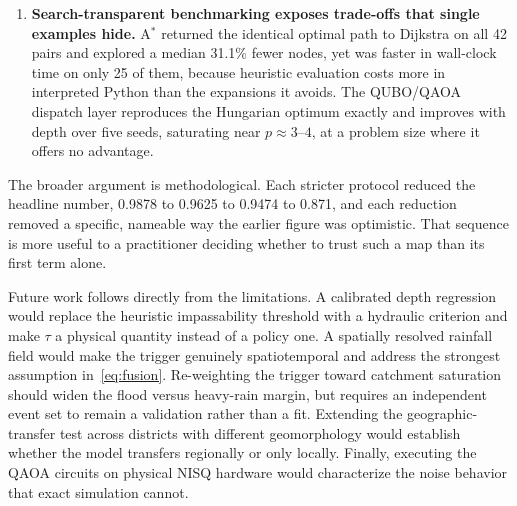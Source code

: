 \documentclass[10pt,twocolumn]{article}
\begin{document}
\begin{enumerate}
      pairs at $\tau\ge0.65$, $0.55$--$0.60$ and $\le0.50$. $\tau$ should be set
      by policy on acceptable risk, not by convention.
\item \textbf{Search-transparent benchmarking exposes trade-offs that single
      examples hide.} A$^\ast$ returned the identical optimal path to Dijkstra on
      all 42 pairs and explored a median 31.1\% fewer nodes, yet was faster in
      wall-clock time on only 25 of them, because heuristic evaluation costs more
      in interpreted Python than the expansions it avoids. The QUBO/QAOA dispatch
      layer reproduces the Hungarian optimum exactly and improves with depth
      over five seeds, saturating near $p\approx3$--$4$, at a problem size where
      it offers no advantage.
\end{enumerate}

The broader argument is methodological. Each stricter protocol reduced the
headline number, 0.9878 to 0.9625 to 0.9474 to 0.871, and each reduction removed
a specific, nameable way the earlier figure was optimistic. That sequence is more
useful to a practitioner deciding whether to trust such a map than its first term
alone.

Future work follows directly from the limitations. A calibrated depth regression
would replace the heuristic impassability threshold with a hydraulic criterion
and make $\tau$ a physical quantity instead of a policy one. A spatially
resolved rainfall field would make the trigger genuinely spatiotemporal and
address the strongest assumption in~\eqref{eq:fusion}. Re-weighting the
trigger toward catchment saturation should widen the flood versus heavy-rain
margin, but requires an independent event set to remain a validation rather than
a fit. Extending the geographic-transfer test across districts with different
geomorphology would establish whether the model transfers regionally or only
locally. Finally, executing the QAOA circuits on physical NISQ hardware would
characterize the noise behavior that exact simulation cannot.


\footnotesize
\end{document}
